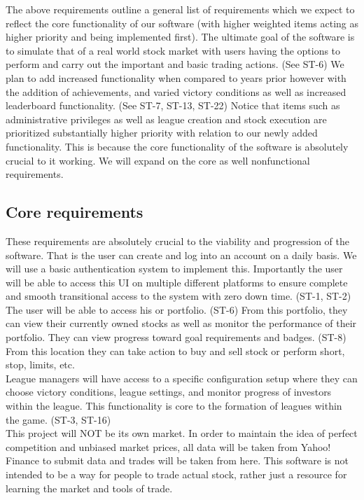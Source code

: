 The above requirements outline a general list of requirements which we expect to reflect the
core functionality of our software (with higher weighted items acting as higher priority and
being implemented first). The ultimate goal of the software is to simulate that of a real
world stock market with users having the options to perform and carry out the important and
basic trading actions. (See ST-6) We plan to add increased functionality when compared to years
prior however with the addition of achievements, and varied victory conditions as well as
increased leaderboard functionality. (See ST-7, ST-13, ST-22)   Notice that items such as
administrative privileges as well as league creation and stock execution are prioritized
substantially higher priority with relation to our newly added functionality. This is because
the core functionality of the software is absolutely crucial to it working. We will expand on
the core as well nonfunctional requirements. \\

\subsection{Core requirements}

These requirements are absolutely crucial to the viability and progression of the software.
That is the user can create and log into an account on a daily basis. We will use a basic
authentication system to implement this. Importantly the user will be able to access this
UI on multiple different platforms to ensure complete and smooth transitional access to the
system with zero down time. (ST-1, ST-2) \\

The user will be able to access his or portfolio. (ST-6) From this portfolio, they can view
their currently owned stocks as well as monitor the performance of their portfolio. They can
view progress toward goal requirements and badges. (ST-8) From this location they can take
action to buy and sell stock or perform short, stop, limits, etc. \\

League managers will have access to a specific configuration setup where they can choose
victory conditions, league settings, and monitor progress of investors within the league.
This functionality is core to the formation of leagues within the game. (ST-3, ST-16)\\

This project will NOT be its own market. In order to maintain the idea of perfect competition
and unbiased market prices, all data will be taken from Yahoo! Finance to submit data and
trades will be taken from here. This software is not intended to be a way for people to
trade actual stock, rather just a resource for learning the market and tools of trade. \\

